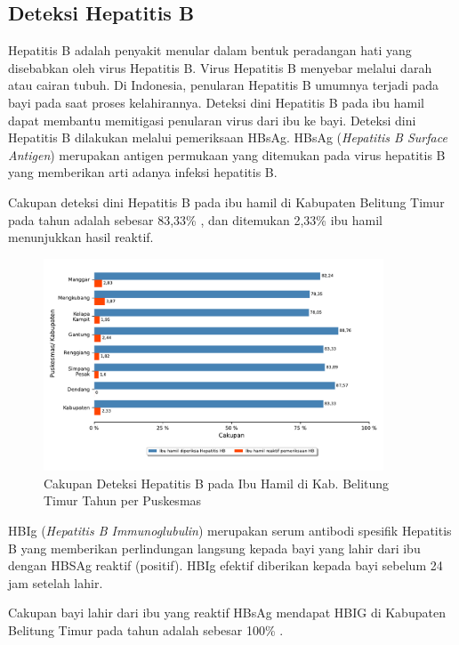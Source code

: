\subsection{Deteksi Hepatitis B}
Hepatitis B adalah penyakit menular dalam bentuk peradangan hati yang disebabkan oleh virus Hepatitis B. Virus Hepatitis B menyebar melalui darah atau cairan tubuh. Di Indonesia, penularan Hepatitis B umumnya terjadi pada bayi pada saat proses kelahirannya. Deteksi dini Hepatitis B pada ibu hamil dapat membantu memitigasi penularan virus dari ibu ke bayi. Deteksi dini Hepatitis B dilakukan melalui pemeriksaan HBsAg. HBsAg (\emph{Hepatitis B Surface Antigen}) merupakan antigen permukaan yang ditemukan pada virus hepatitis B yang memberikan arti adanya infeksi hepatitis B.

Cakupan deteksi dini Hepatitis B pada ibu hamil di Kabupaten Belitung Timur pada tahun \tP adalah sebesar 83,33\% , dan ditemukan 2,33\% ibu hamil menunjukkan hasil reaktif.

\begin{figure}[H]
	\centering{}
	\includegraphics[width=0.9\textwidth]{bab_06/bab_06_05a_bumilHB}
	\caption{Cakupan Deteksi Hepatitis B pada Ibu Hamil di Kab. Belitung Timur Tahun \tP per Puskesmas}
	\label{fig:Cakupan-Bumil-HB}
\end{figure}

HBIg (\emph{Hepatitis B Immunoglubulin}) merupakan serum antibodi spesifik Hepatitis B yang memberikan perlindungan langsung kepada bayi yang lahir dari ibu dengan HBSAg reaktif (positif). HBIg efektif diberikan kepada bayi sebelum 24 jam setelah lahir.

Cakupan bayi lahir dari ibu yang reaktif HBsAg mendapat HBIG di Kabupaten Belitung Timur pada tahun \tP adalah sebesar 100\% .


